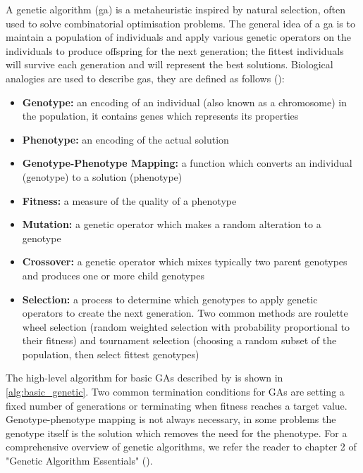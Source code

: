 A genetic algorithm (\acrshort{ga}) is a \gls{metaheuristic} inspired by natural selection, often used to solve combinatorial optimisation problems. The general idea of a \acrshort{ga} is to maintain a population of individuals and apply various genetic operators on the individuals to produce offspring for the next generation; the fittest individuals will survive each generation and will represent the best solutions. Biological analogies are used to describe \acrshort{ga}s, they are defined as follows (\cite{kramer_genetic_2017}):
\begin{itemize}
    \item \textbf{Genotype:} an encoding of an individual (also known as a chromosome) in the population, it contains genes which represents its properties
    \item \textbf{Phenotype:} an encoding of the actual solution
    \item \textbf{Genotype-Phenotype Mapping:} a function which converts an individual (genotype) to a solution (phenotype)
    \item \textbf{Fitness:} a measure of the quality of a phenotype
    \item \textbf{Mutation:} a genetic operator which makes a random alteration to a genotype
    \item \textbf{Crossover:} a genetic operator which mixes typically two parent genotypes and produces one or more child genotypes
    \item \textbf{Selection:} a process to determine which genotypes to apply genetic operators to create the next generation. Two common methods are roulette wheel selection (random weighted selection with probability proportional to their fitness) and tournament selection (choosing a random subset of the population, then select fittest genotypes)
\end{itemize}

The high-level algorithm for basic GAs described by \textcite{kramer_genetic_2017} is shown in \cref{alg:basic_genetic}. Two common termination conditions for GAs are setting a fixed number of generations or terminating when fitness reaches a target value. Genotype-phenotype mapping is not always necessary, in some problems the genotype itself is the solution which removes the need for the phenotype. For a comprehensive overview of genetic algorithms, we refer the reader to chapter 2 of "Genetic Algorithm Essentials" (\cite{kramer_genetic_2017}).




